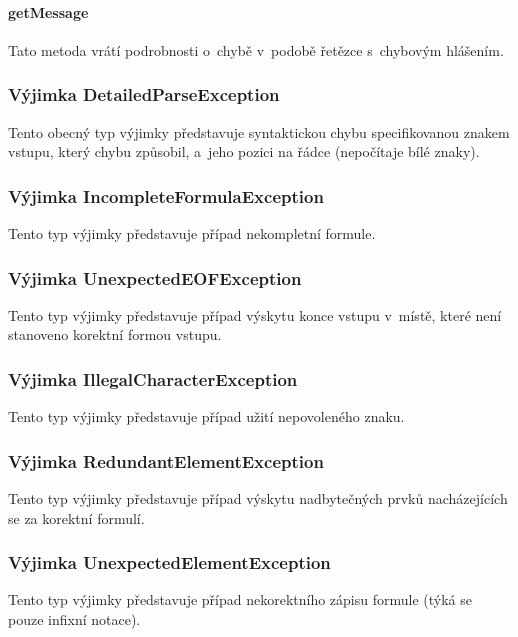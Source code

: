 \documentclass[thesis=B,czech,hidelinks]{thesis}[2012/06/26]
\begin{document}
\paragraph{getMessage}

Tato metoda vrátí podrobnosti o~chybě v~podobě řetězce s~chybovým hlášením.

\subsubsection{Výjimka DetailedParseException}

Tento obecný typ výjimky představuje syntaktickou chybu specifikovanou znakem vstupu, který chybu způsobil, a~jeho pozici na řádce (nepočítaje bílé znaky).

\subsubsection{Výjimka IncompleteFormulaException}

Tento typ výjimky představuje případ nekompletní formule.

\subsubsection{Výjimka UnexpectedEOFException}

Tento typ výjimky představuje případ výskytu konce vstupu v~místě, které není stanoveno korektní formou vstupu.

\subsubsection{Výjimka IllegalCharacterException}

Tento typ výjimky představuje případ užití nepovoleného znaku.

\subsubsection{Výjimka RedundantElementException}

Tento typ výjimky představuje případ výskytu nadbytečných prvků nacházejících se za korektní formulí.

\subsubsection{Výjimka UnexpectedElementException}

Tento typ výjimky představuje případ nekorektního zápisu formule (týká se pouze infixní notace).
\end{document}
